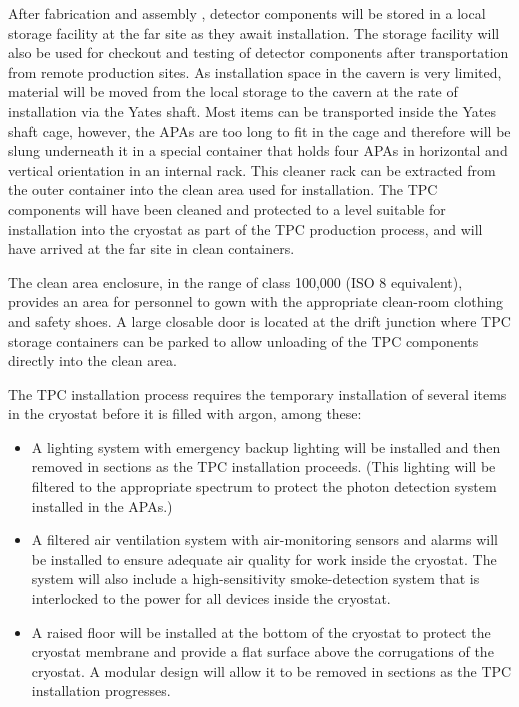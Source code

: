 After fabrication and assembly , detector components will be stored in a local storage 
facility at the far site as they await installation.
The storage facility will also be
used for checkout and testing of detector components after
transportation from remote production sites.  As installation space in
the cavern is very limited, material will be moved from the
local storage to the cavern at the rate of installation via the Yates shaft. 
 Most items can be
transported inside the Yates shaft cage, however, the APAs are too
long to fit in the cage and therefore will be slung underneath it in a special %
container that holds four APAs in
horizontal and vertical orientation 
in an internal rack. %
This cleaner rack %
can be extracted from the outer container into the clean area used for installation.
The TPC components will have been cleaned and
protected to a level suitable for installation into the cryostat as
part of the TPC production process, and will %
have arrived at the far
site in clean containers.

The clean area enclosure, in the range of class 100,000 (ISO 8
equivalent), %
provides an area for personnel to gown with the appropriate
clean-room clothing and safety shoes. A large closable door is
located at the drift junction where TPC storage containers can be
parked to allow unloading of the TPC components 
directly %
into the clean area. 

The TPC installation process requires the temporary installation of several 
items in the cryostat before it is filled with argon, among these:
\begin{itemize}
\item A lighting system with emergency backup lighting will be installed and then removed in sections
as the TPC installation proceeds. (This lighting will be filtered
to the appropriate spectrum to protect the photon detection system
installed in the APAs.) 
\item A filtered air ventilation system
with air-monitoring sensors and alarms will be installed to ensure adequate air
quality for work inside the cryostat. The system will also include a
high-sensitivity smoke-detection system that is interlocked to the
power for all devices inside the cryostat. 
\item A raised floor will be
installed at the bottom of the cryostat to protect the cryostat
membrane and provide a flat surface above the corrugations of the
cryostat. A modular design will allow it to be removed
in sections as the TPC installation progresses.
\end{itemize}




